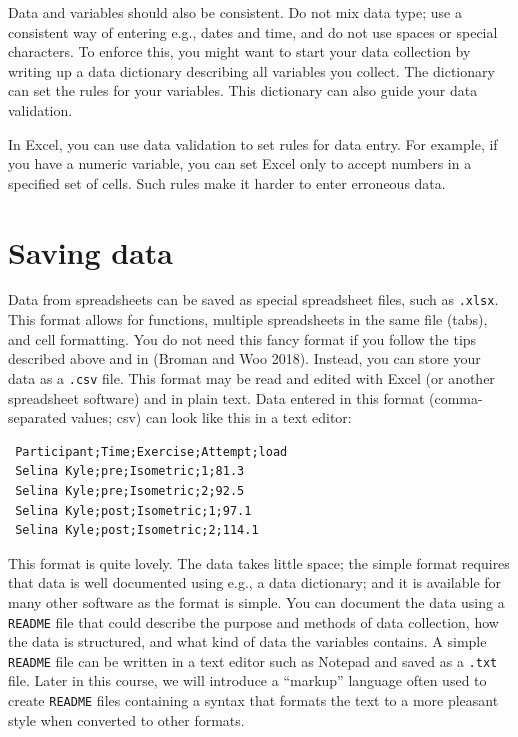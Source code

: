 \documentclass[
  11pt,
  letterpaper,
]{scrbook}
\begin{document}
Data and variables should also be consistent. Do not mix data type; use
a consistent way of entering e.g., dates and time, and do not use spaces
or special characters. To enforce this, you might want to start your
data collection by writing up a data dictionary describing all variables
you collect. The dictionary can set the rules for your variables. This
dictionary can also guide your data validation.

In Excel, you can use data validation to set rules for data entry. For
example, if you have a numeric variable, you can set Excel only to
accept numbers in a specified set of cells. Such rules make it harder to
enter erroneous data.

\hypertarget{saving-data}{%
\section{Saving data}\label{saving-data}}

Data from spreadsheets can be saved as special spreadsheet files, such
as \texttt{.xlsx}. This format allows for functions, multiple
spreadsheets in the same file (tabs), and cell formatting. You do not
need this fancy format if you follow the tips described above and in
(Broman and Woo 2018). Instead, you can store your data as a
\texttt{.csv} file. This format may be read and edited with Excel (or
another spreadsheet software) and in plain text. Data entered in this
format (comma-separated values; csv) can look like this in a text
editor:

\begin{verbatim}
 Participant;Time;Exercise;Attempt;load
 Selina Kyle;pre;Isometric;1;81.3  
 Selina Kyle;pre;Isometric;2;92.5
 Selina Kyle;post;Isometric;1;97.1
 Selina Kyle;post;Isometric;2;114.1
\end{verbatim}

This format is quite lovely. The data takes little space; the simple
format requires that data is well documented using e.g., a data
dictionary; and it is available for many other software as the format is
simple. You can document the data using a \texttt{README} file that
could describe the purpose and methods of data collection, how the data
is structured, and what kind of data the variables contains. A simple
\texttt{README} file can be written in a text editor such as Notepad and
saved as a \texttt{.txt} file. Later in this course, we will introduce a
``markup'' language often used to create \texttt{README} files
containing a syntax that formats the text to a more pleasant style when
converted to other formats.
\end{document}
